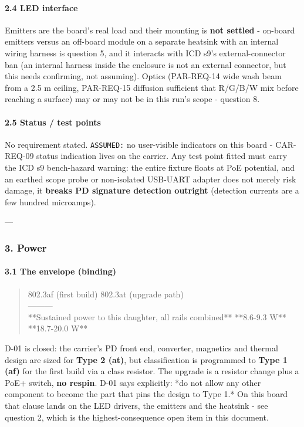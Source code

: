 \documentclass[11pt,a4paper]{article}
\begin{document}
\paragraph*{2.4 LED interface}
Emitters are the board's real load and their mounting is \textbf{not settled} - on-board emitters versus an off-board module on a separate heatsink with an internal wiring harness is question 5, and it interacts with ICD s9's external-connector ban (an internal harness inside the enclosure is not an external connector, but this needs confirming, not assuming). Optics (PAR-REQ-14 wide wash beam from a 2.5 m ceiling, PAR-REQ-15 diffusion sufficient that R/G/B/W mix before reaching a surface) may or may not be in this run's scope - question 8.

\paragraph*{2.5 Status / test points}
No requirement stated. \texttt{ASSUMED:} no user-visible indicators on this board - CAR-REQ-09 status indication lives on the carrier. Any test point fitted must carry the ICD s9 bench-hazard warning: the entire fixture floats at PoE potential, and an earthed scope probe or non-isolated USB-UART adapter does not merely risk damage, it \textbf{breaks PD signature detection outright} (detection currents are a few hundred microamps).

---

\subsubsection*{3. Power}
\paragraph*{3.1 The envelope (binding)}
\begin{quote}\small\ttfamily\raggedright
\textbar{} \textbar{} 802.3af (first build) \textbar{} 802.3at (upgrade path) \textbar{}\\
\textbar{}---\textbar{}---\textbar{}---\textbar{}\\
\textbar{} {*}{*}Sustained power to this daughter, all rails combined{*}{*} \textbar{} {*}{*}8.6-9.3 W{*}{*} \textbar{} {*}{*}18.7-20.0 W{*}{*} \textbar{}
\end{quote}
D-01 is closed: the carrier's PD front end, converter, magnetics and thermal design are sized for \textbf{Type 2 (at)}, but classification is programmed to \textbf{Type 1 (af)} for the first build via a class resistor. The upgrade is a resistor change plus a PoE+ switch, \textbf{no respin}. D-01 says explicitly: {*}do not allow any other component to become the part that pins the design to Type 1.{*} On this board that clause lands on the LED drivers, the emitters and the heatsink - see question 2, which is the highest-consequence open item in this document.
\end{document}
